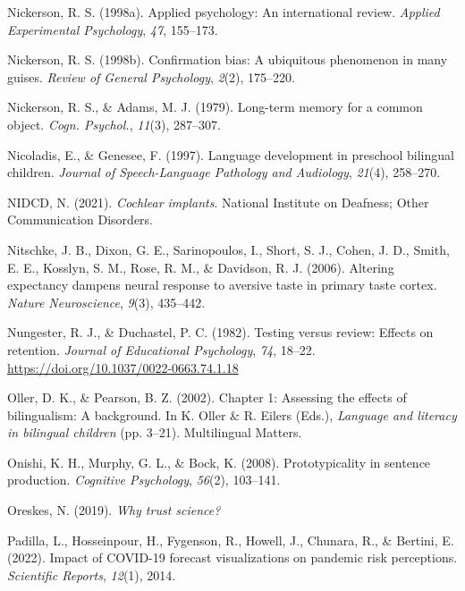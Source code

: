 \documentclass[
]{krantz}
\newlength{\cslhangindent}
\newenvironment{CSLReferences}[2] %
 {\begin{list}{}{%
  \setlength{\itemindent}{0pt}
  \setlength{\leftmargin}{0pt}
  \setlength{\parsep}{0pt}
  \ifodd #1
   \setlength{\leftmargin}{\cslhangindent}
   \setlength{\itemindent}{-1\cslhangindent}
  \fi
  \setlength{\itemsep}{#2\baselineskip}}}
 {\end{list}}
\begin{document}
\begin{CSLReferences}{1}{0}
Nickerson, R. S. (1998a). Applied psychology: An international review. \emph{Applied Experimental Psychology}, \emph{47}, 155--173.

Nickerson, R. S. (1998b). Confirmation bias: A ubiquitous phenomenon in many guises. \emph{Review of General Psychology}, \emph{2}(2), 175--220.

Nickerson, R. S., \& Adams, M. J. (1979). Long-term memory for a common object. \emph{Cogn. Psychol.}, \emph{11}(3), 287--307.

Nicoladis, E., \& Genesee, F. (1997). Language development in preschool bilingual children. \emph{Journal of Speech-Language Pathology and Audiology}, \emph{21}(4), 258--270.

NIDCD, N. (2021). \emph{Cochlear implants}. National Institute on Deafness; Other Communication Disorders.

Nitschke, J. B., Dixon, G. E., Sarinopoulos, I., Short, S. J., Cohen, J. D., Smith, E. E., Kosslyn, S. M., Rose, R. M., \& Davidson, R. J. (2006). Altering expectancy dampens neural response to aversive taste in primary taste cortex. \emph{Nature Neuroscience}, \emph{9}(3), 435--442.

Nungester, R. J., \& Duchastel, P. C. (1982). Testing versus review: Effects on retention. \emph{Journal of Educational Psychology}, \emph{74}, 18--22. \url{https://doi.org/10.1037/0022-0663.74.1.18}

Oller, D. K., \& Pearson, B. Z. (2002). Chapter 1: Assessing the effects of bilingualism: A background. In K. Oller \& R. Eilers (Eds.), \emph{Language and literacy in bilingual children} (pp. 3--21). Multilingual Matters.

Onishi, K. H., Murphy, G. L., \& Bock, K. (2008). Prototypicality in sentence production. \emph{Cognitive Psychology}, \emph{56}(2), 103--141.

Oreskes, N. (2019). \emph{Why trust science?}

Padilla, L., Hosseinpour, H., Fygenson, R., Howell, J., Chunara, R., \& Bertini, E. (2022). Impact of COVID-19 forecast visualizations on pandemic risk perceptions. \emph{Scientific Reports}, \emph{12}(1), 2014.


\end{CSLReferences}
\end{document}
